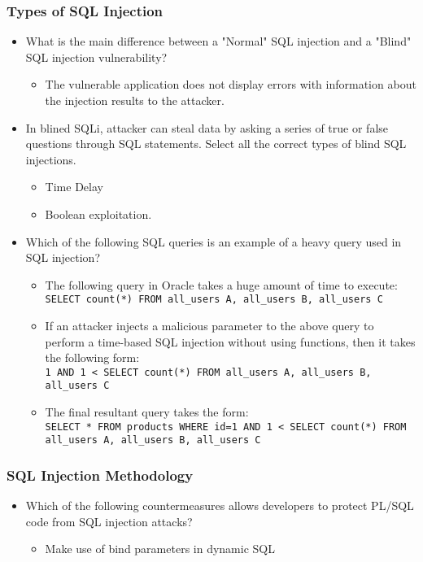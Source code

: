 \subsubsection{Types of SQL Injection}
\begin{itemize}
    \item What is the main difference between a "Normal" SQL injection and a "Blind" SQL injection vulnerability?
    \begin{itemize}
        \item The vulnerable application does not display errors with information about the injection results to the attacker.
    \end{itemize}
    \item In blined SQLi, attacker can steal data by asking a series of true or false questions through SQL statements. Select all the correct types of blind SQL injections.
    \begin{itemize}
        \item Time Delay
        \item Boolean exploitation.
    \end{itemize}
    \item Which of the following SQL queries is an example of a heavy query used in SQL injection?
    \begin{itemize}
        \item The following query in Oracle takes a huge amount of time to execute:\\
        \verb|SELECT count(*) FROM all_users A, all_users B, all_users C|
        \item If an attacker injects a malicious parameter to the above query to perform a time-based SQL injection without using functions, then it takes the following form:\\
        \verb|1 AND 1 < SELECT count(*) FROM all_users A, all_users B, all_users C|
        \item The final resultant query takes the form:\\
        \verb|SELECT * FROM products WHERE id=1 AND 1 < SELECT count(*) FROM all_users A, all_users B, all_users C|
    \end{itemize}
\end{itemize}
\subsubsection{SQL Injection Methodology}
\begin{itemize}
    \item Which of the following countermeasures allows developers to protect PL/SQL code from SQL injection attacks?
    \begin{itemize}
        \item Make use of bind parameters in dynamic SQL
    \end{itemize}
\end{itemize}
